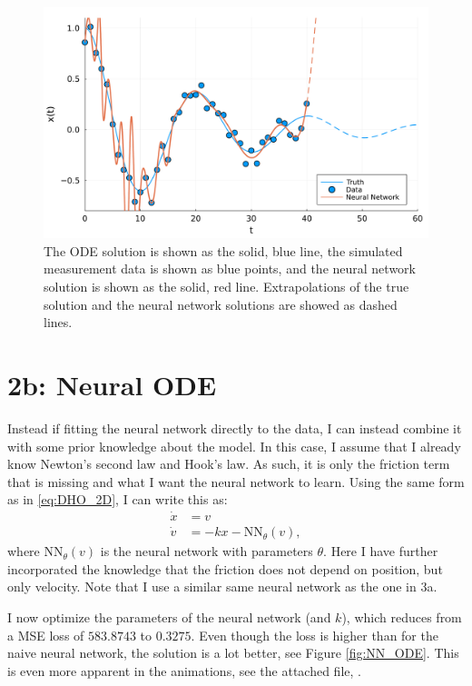 \documentclass[10pt,a4paper]{article}
\begin{document}
\begin{figure}[H]
    \includegraphics[width=\linewidth]{no_ode_etxrapolated.pdf}
    \caption{The ODE solution is shown as the solid, blue line,
        the simulated measurement data is shown as blue points,
        and the neural network solution is shown as the solid, red line.
        Extrapolations of the true solution and the neural network solutions are showed as dashed lines.}
    \label{fig:NN_naive_extrapolation}
\end{figure}

\section*{2b: Neural ODE}

Instead if fitting the neural network directly to the data, I can instead combine it with some prior knowledge about the model.
In this case, I assume that I already know Newton's second law and Hook's law.
As such, it is only the friction term that is missing and what I want the neural network to learn.
Using the same form as in \eqref{eq:DHO_2D}, I can write this as:
\begin{equation}
    \begin{split}
        \dot{x} &= v \\
        \dot{v} &= -kx - \mathrm{NN}_\theta(v),
    \end{split}
    \label{eq:DHO_2D_NN}
\end{equation}
where $\mathrm{NN}_\theta(v)$ is the neural network with parameters $\theta$.
Here I have further incorporated the knowledge that the friction does not depend on position, but only velocity.
Note that I use a similar same neural network as the one in 3a.

I now optimize the parameters of the neural network (and $k$), which reduces from a MSE loss of $583.8743$ to $0.3275$.
Even though the loss is higher than for the naive neural network, the solution is a lot better, see Figure \ref{fig:NN_ODE}.
This is even more apparent in the animations, see the attached file, .
\end{document}
